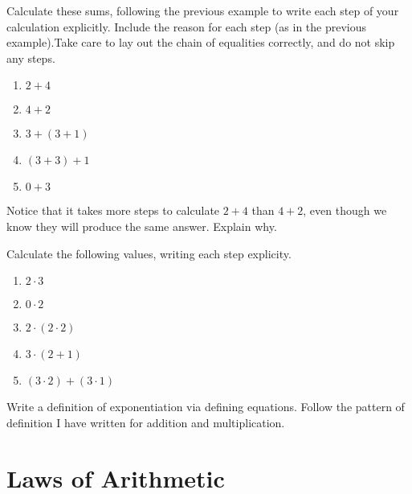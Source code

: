 \begin{exercises}
\begin{exerciselist}
\item Calculate these sums, following the previous example to write
  each step of your calculation explicitly. Include the reason for
  each step (as in the previous example).Take care to lay out the
  chain of equalities correctly, and do not skip any steps.
\begin{enumerate}
\item $2+4$
\item $4+2$
\item $3+(3+1)$
\item $(3+3)+1$
\item $0 + 3$
\end{enumerate}

\item Notice that it takes more steps to calculate $2+4$ than $4+2$, even though we know they will produce the same answer. Explain why.

\item Calculate the following values, writing each step explicity. 
 \begin{enumerate}
    \item $2\cdot 3$
    \item $0\cdot 2$
    \item $2\cdot(2\cdot 2)$
    \item $3\cdot(2 + 1)$
    \item $(3\cdot 2) + (3\cdot 1)$
    \end{enumerate}
\item Write a definition of exponentiation via defining equations. Follow the pattern
of definition I have written for addition and multiplication.
\end{exerciselist}
\end{exercises}

\chapter{Laws of Arithmetic}\label{lec:ArithmeticLaws}

